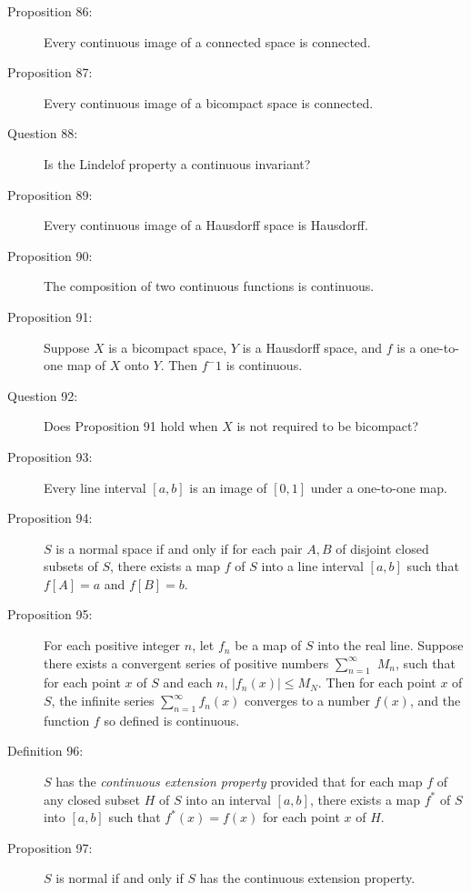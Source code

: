 \documentclass{article}
\begin{document}
\begin{description}
  \item[Proposition 86:] Every continuous image of a connected space is connected.

  \item[Proposition 87:] Every continuous image of a bicompact space is connected.

  \item[Question 88:] Is the Lindelof property a continuous invariant?

  \item[Proposition 89:] Every continuous image of a Hausdorff space is Hausdorff.

  \item[Proposition 90:] The composition of two continuous functions is continuous.

  \item[Proposition 91:] Suppose $X$ is a bicompact space, $Y$ is a Hausdorff space, and $f$ is a one-to-one map of $X$ onto $Y$. Then $f^-1$ is continuous.

  \item[Question 92:] Does Proposition 91 hold when $X$ is not required to be bicompact?

  \item[Proposition 93:] Every line interval $[a,b]$ is an image of $[0,1]$ under a one-to-one map.

  \item[Proposition 94:] $S$ is a normal space if and only if for each pair $A, B$ of disjoint closed subsets of $S$, there exists a map $f$ of $S$ into a line interval $[a,b]$ such that $f[A] = a$ and $f[B] = b$.

  \item[Proposition 95:] For each positive integer $n$, let $f_n$ be a map of $S$ into the real line. Suppose there exists a convergent series of positive numbers $\sum_{n=1}^\infty$ $M_n$, such that for each point $x$ of $S$ and each $n$, $\vert f_n(x) \vert \leq{M_N}$. Then for each point $x$ of $S$, the infinite series $\sum_{n=1}^\infty f_n(x)$ converges to a number $f(x)$, and the function $f$ so defined is continuous.

  \item[Definition 96:] $S$ has the \emph{continuous extension property} provided that for each map $f$ of any closed subset $H$ of $S$ into an interval $[a,b]$, there exists a map $f^*$ of $S$ into $[a,b]$ such that $f^*(x) = f(x)$ for each point $x$ of $H$.

  \item[Proposition 97:] $S$ is normal if and only if $S$ has the continuous extension property.


\end{description}
\end{document}
